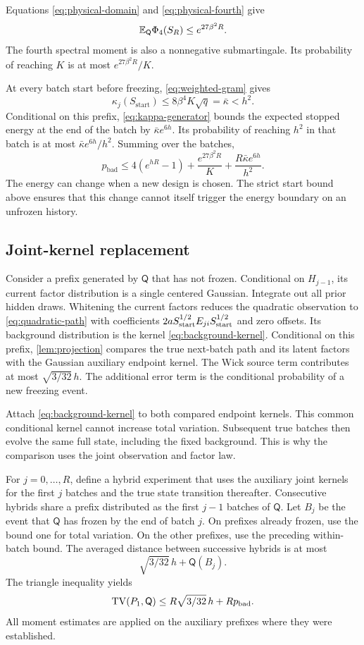 Equations \eqref{eq:physical-domain} and \eqref{eq:physical-fourth} give
\[
 \mathbb E_{\mathsf Q}\Phi_4(S_R)\le e^{27\beta^2R}.
\]
The fourth spectral moment is also a nonnegative submartingale. Its probability of reaching $K$ is at most $e^{27\beta^2R}/K$.

At every batch start before freezing, \cref{eq:weighted-gram} gives
\[
 \kappa_j(S_{\mathrm{start}})
 \le8\beta^4K\sqrt q=\bar\kappa<h^2.
\]
Conditional on this prefix, \cref{eq:kappa-generator} bounds the expected stopped energy at the end of the batch by
$\bar\kappa e^{6h}$. Its probability of reaching $h^2$ in that batch is at most $\bar\kappa e^{6h}/h^2$. Summing over the batches,
\begin{equation}
 p_{\mathrm{bad}}\le
 4(e^{hR}-1)+\frac{e^{27\beta^2R}}{K}
             +\frac{R\bar\kappa e^{6h}}{h^2}.
 \label{eq:pbad}
\end{equation}
The energy can change when a new design is chosen. The strict start bound above ensures that this change cannot itself trigger the energy boundary on an unfrozen history.

\subsection{Joint-kernel replacement}

Consider a prefix generated by $\mathsf Q$ that has not frozen. Conditional on $H_{j-1}$, its current factor distribution is a single centered Gaussian. Integrate out all prior hidden draws. Whitening the current factors reduces the quadratic observation to \eqref{eq:quadratic-path} with coefficients $2aS_{\rm start}^{1/2}E_{ji}S_{\rm start}^{1/2}$ and zero offsets. Its background distribution is the kernel \eqref{eq:background-kernel}. Conditional on this prefix, \cref{lem:projection} compares the true next-batch path and its latent factors with the Gaussian auxiliary endpoint kernel. The Wick source term contributes at most $\sqrt{3/32}\,h$. The additional error term is the conditional probability of a new freezing event.

Attach \eqref{eq:background-kernel} to both compared endpoint kernels. This common conditional kernel cannot increase total variation. Subsequent true batches then evolve the same full state, including the fixed background. This is why the comparison uses the joint observation and factor law.

For $j=0,\ldots,R$, define a hybrid experiment that uses the auxiliary joint kernels for the first $j$ batches and the true state transition thereafter. Consecutive hybrids share a prefix distributed as the first $j-1$ batches of $\mathsf Q$. Let $B_j$ be the event that $\mathsf Q$ has frozen by the end of batch $j$. On prefixes already frozen, use the bound one for total variation. On the other prefixes, use the preceding within-batch bound. The averaged distance between successive hybrids is at most
\[
 \sqrt{3/32}\,h+\mathsf Q(B_j).
\]
The triangle inequality yields
\begin{equation}
 \operatorname{TV}(P_1,\mathsf Q)\le
 R\sqrt{3/32}\,h+Rp_{\mathrm{bad}}.
 \label{eq:hybrid}
\end{equation}
All moment estimates are applied on the auxiliary prefixes where they were established.

